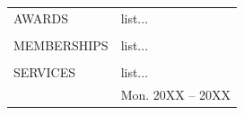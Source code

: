\documentclass[oneside,openany]{report}
\begin{document}
\begin{singlespace}
\begin{longtable}{p{} p{}}
		AWARDS    
		& list... \vspace{0.05in}
		\\\\
		
		MEMBERSHIPS    
		& list...
		\\\\
		
		SERVICES    
		& list... \\&\hfill Mon. 20XX -- 20XX \\
\end{longtable}\addtocounter{table}{-1}
\end{singlespace}
\end{document}
